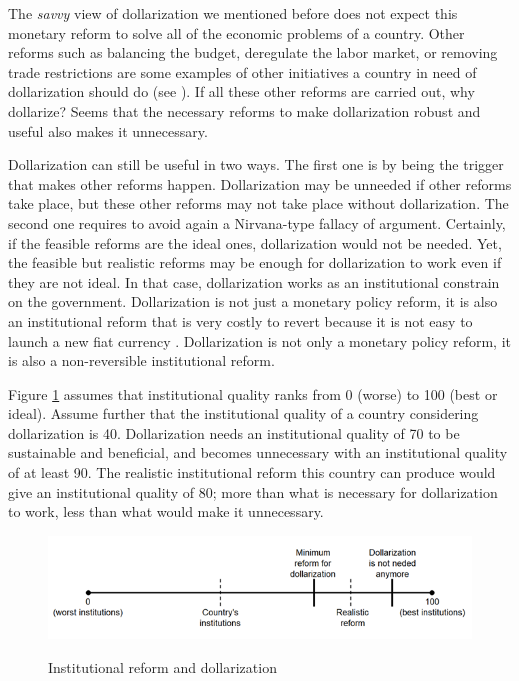 \documentclass[12pt]{article}
\begin{document}
The \textit{savvy} view of dollarization we mentioned before does not expect this monetary reform to solve all of the economic problems of a country. Other reforms such as balancing the budget, deregulate the labor market, or removing trade restrictions are some examples of other initiatives a country in need of dollarization should do (see \parencite[][pp. 17-20]{Jacome2010}). If all these other reforms are carried out, why dollarize? Seems that the necessary reforms to make dollarization robust and useful also makes it unnecessary.

Dollarization can still be useful in two ways. The first one is by being the trigger that makes other reforms happen. Dollarization may be unneeded if other reforms take place, but these other reforms may not take place without dollarization. The second one requires to avoid again a Nirvana-type fallacy of argument. Certainly, if the feasible reforms are the ideal ones, dollarization would not be needed. Yet, the feasible but realistic reforms may be enough for dollarization to work even if they are not ideal. In that case, dollarization works as an institutional constrain on the government. Dollarization is not just a monetary policy reform, it is also an institutional reform that is very costly to revert because it is not easy to launch a new fiat currency \parencite[see]{Selgin1994b}. Dollarization is not only a monetary policy reform, it is also a non-reversible institutional reform.

Figure \ref{fig:Fig01} assumes that institutional quality ranks from 0 (worse) to 100 (best or ideal). Assume further that the institutional quality of a country considering dollarization is 40. Dollarization needs an institutional quality of 70 to be sustainable and beneficial, and becomes unnecessary with an institutional quality of at least 90. The realistic institutional reform this country can produce would give an institutional quality of 80; more than what is necessary for dollarization to work, less than what would make it unnecessary.

\begin{figure}[!htbp]
    \caption{Institutional reform and dollarization}
    \centering
    \includegraphics{Figures/Fig_01.png}
    \label{fig:Fig01}
\end{figure}
\end{document}
